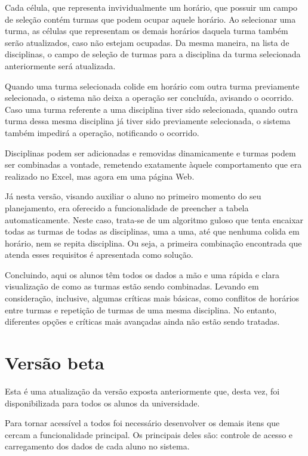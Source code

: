 \documentclass[graduacao,brazil]{ThesisPUC}
\begin{document}
Cada célula, que representa invividualmente um horário, que possuir um campo de seleção contém turmas que podem ocupar aquele horário. Ao selecionar uma turma, as células que representam os demais horários daquela turma também serão atualizados, caso não estejam ocupadas. Da mesma maneira, na lista de disciplinas, o campo de seleção de turmas para a disciplina da turma selecionada anteriormente será atualizada.

Quando uma turma selecionada colide em horário com outra turma previamente selecionada, o sistema não deixa a operação ser concluída, avisando o ocorrido. Caso uma turma referente a uma disciplina tiver sido selecionada, quando outra turma dessa mesma disciplina já tiver sido previamente selecionada, o sistema também impedirá a operação, notificando o ocorrido.

Disciplinas podem ser adicionadas e removidas dinamicamente e turmas podem ser combinadas a vontade, remetendo exatamente àquele comportamento que era realizado no Excel, mas agora em uma página Web.

Já nesta versão, visando auxiliar o aluno no primeiro momento do seu planejamento, era oferecido a funcionalidade de preencher a tabela automaticamente. Neste caso, trata-se de um algoritmo guloso que tenta encaixar todas as turmas de todas as disciplinas, uma a uma, até que nenhuma colida em horário, nem se repita disciplina. Ou seja, a primeira combinação encontrada que atenda esses requisitos é apresentada como solução.

Concluindo, aqui os alunos têm todos os dados a mão e uma rápida e clara visualização de como as turmas estão sendo combinadas. Levando em consideração, inclusive, algumas críticas mais básicas, como conflitos de horários entre turmas e repetição de turmas de uma mesma disciplina. No entanto, diferentes opções e críticas mais avançadas ainda não estão sendo tratadas.


\section{Versão beta}

Esta é uma atualização da versão exposta anteriormente que, desta vez, foi disponibilizada para todos os alunos da universidade.

Para tornar acessível a todos foi necessário desenvolver os demais itens que cercam a funcionalidade principal. Os principais deles são: controle de acesso e carregamento dos dados de cada aluno no sistema.
\end{document}
